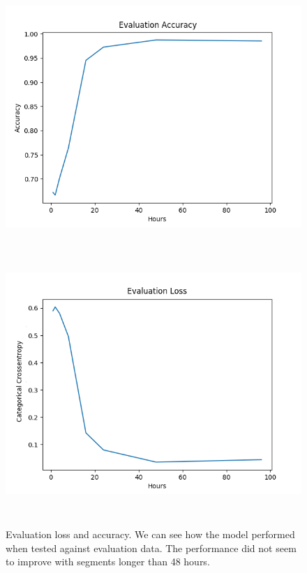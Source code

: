 \begin{figure}
\begin{center}
      \includegraphics[height=10cm]{img/control_condition/plot_acc_eval.png}
      \includegraphics[height=10cm]{img/control_condition/plot_loss_eval.png}

      \caption{Evaluation loss and accuracy. We can see how the model performed when tested against evaluation data. The performance did not seem to improve with segments longer than 48 hours.}
      \label{figure:control_condition_10e_eval}
\end{center}
\end{figure}

